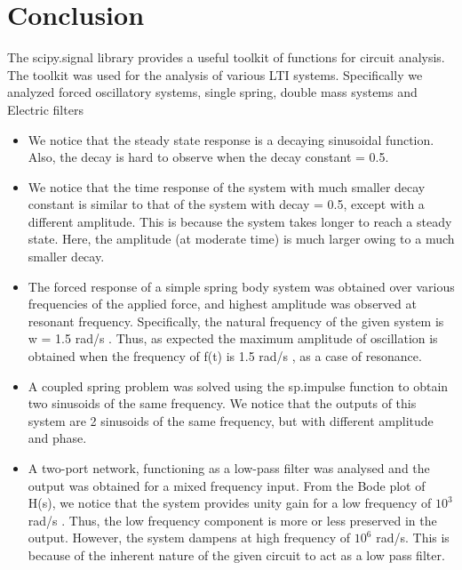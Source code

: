\documentclass{article}
\begin{document}
\section{Conclusion}
The scipy.signal library provides a useful toolkit of functions for circuit
analysis. The toolkit was used for the analysis of various LTI systems. Specifically we analyzed forced oscillatory systems, single spring, double mass systems and Electric filters

\begin{itemize}
\item We notice that the steady state response is a decaying sinusoidal function. Also, the decay is hard to observe when the decay constant = 0.5.

\item We notice that the time response of the system with much smaller decay constant is similar to that of the system with decay = 0.5, except with a
different amplitude. This is because the system takes longer to reach a steady
state.
Here, the amplitude (at moderate time) is much larger owing to a much
smaller decay.
	
\item The forced response of a simple spring body system was obtained
over various frequencies of the applied force, and highest amplitude was
observed at resonant frequency. Specifically, the natural frequency of the given system is w = 1.5 rad/s . Thus, as expected the maximum amplitude of oscillation is obtained when the frequency of f(t) is 1.5 rad/s , as a case of resonance.

\item A coupled spring problem was solved using
the sp.impulse function to obtain two sinusoids of the same frequency. We notice that the outputs of this system are 2 sinusoids of the same frequency, but
with different amplitude and phase.

\item A two-port network, functioning as a low-pass filter was analysed and the
output was obtained for a mixed frequency input. From the Bode plot of H(s), we notice that the system provides unity gain
for a low frequency of $10^3$
rad/s . Thus, the low frequency component is
more or less preserved in the output. However, the system dampens at high
frequency of $10^6$
rad/s. This is because of the inherent nature of the given circuit to act as a low pass filter.
\end{itemize}
\end{document}
